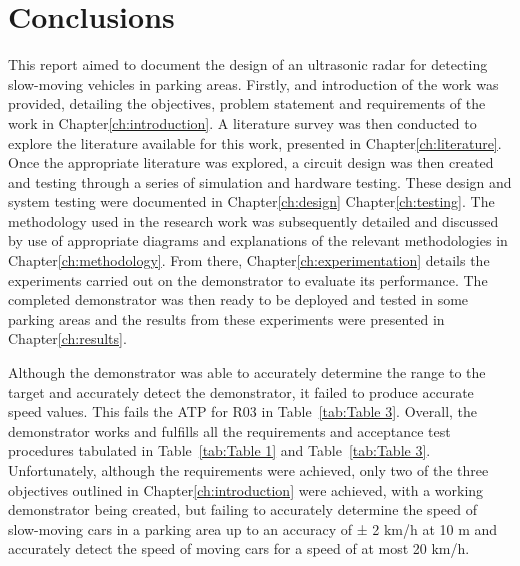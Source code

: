 \documentclass[class=report,11pt,crop=false]{standalone}
\begin{document}
\chapter{Conclusions \label{ch:conclusions}}
\vspace{-1cm}
This report aimed to document the design of an ultrasonic \gls{radar} for detecting slow-moving vehicles in parking areas. Firstly, and introduction of the work was provided, detailing the objectives, problem statement and requirements of the work in Chapter\ref{ch:introduction}. A literature survey was then conducted to explore the literature available for this work, presented in Chapter\ref{ch:literature}. Once the appropriate literature was explored, a circuit design was then created and testing through a series of simulation and hardware testing. These design and system testing were documented in Chapter\ref{ch:design} Chapter\ref{ch:testing}. The methodology used in the research work was subsequently detailed and discussed by use of appropriate diagrams and explanations of the relevant methodologies in Chapter\ref{ch:methodology}. From there, Chapter\ref{ch:experimentation} details the experiments carried out on the demonstrator to evaluate its performance. The completed demonstrator was then ready to be deployed and tested in some parking areas and the results from these experiments were presented in Chapter\ref{ch:results}.

Although the demonstrator was able to accurately determine the range to the target and accurately detect the demonstrator, it failed to produce accurate speed values. This fails the ATP for R03 in Table~\ref{tab:Table 3}. Overall, the demonstrator works and fulfills all the requirements and acceptance test procedures tabulated in Table~\ref{tab:Table 1} and Table~\ref{tab:Table 3}. Unfortunately, although the requirements were achieved, only two of the three objectives outlined in Chapter\ref{ch:introduction} were achieved, with a working demonstrator being created, but failing to accurately determine the speed of slow-moving cars in a parking area up to an accuracy of ± 2 km/h at 10 m and accurately detect the speed of moving cars for a speed of at most 20 km/h.
\ifstandalone

\printnoidxglossary[type=\acronymtype,nonumberlist]
\fi
\end{document}
